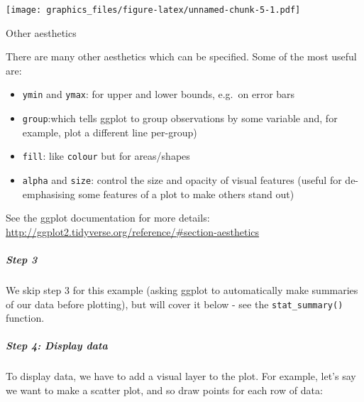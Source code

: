 \documentclass[]{article}
\newenvironment{Shaded}{\begin{snugshade}}{\end{snugshade}}
\newcommand{\KeywordTok}[1]{\textcolor[rgb]{0.13,0.29,0.53}{\textbf{#1}}}
\newcommand{\DataTypeTok}[1]{\textcolor[rgb]{0.13,0.29,0.53}{#1}}
\newcommand{\StringTok}[1]{\textcolor[rgb]{0.31,0.60,0.02}{#1}}
\newcommand{\OperatorTok}[1]{\textcolor[rgb]{0.81,0.36,0.00}{\textbf{#1}}}
\newcommand{\NormalTok}[1]{#1}
\providecommand{\tightlist}{%
  \setlength{\itemsep}{0pt}\setlength{\parskip}{0pt}}
\let\oldsubparagraph\subparagraph
\renewcommand{\subparagraph}[1]{\oldsubparagraph{#1}\mbox{}}
\theoremstyle{definition}
\theoremstyle{definition}
\theoremstyle{definition}
\theoremstyle{remark}
\begin{document}
\begin{Shaded}
\end{Shaded}

\texttt{[image: graphics\_files/figure-latex/unnamed-chunk-5-1.pdf]}

Other aesthetics

There are many other aesthetics which can be specified. Some of the most
useful are:

\begin{itemize}
\tightlist
\item
  \texttt{ymin} and \texttt{ymax}: for upper and lower bounds, e.g.~on
  error bars
\item
  \texttt{group}:which tells ggplot to group observations by some
  variable and, for example, plot a different line per-group)
\item
  \texttt{fill}: like \texttt{colour} but for areas/shapes
\item
  \texttt{alpha} and \texttt{size}: control the size and opacity of
  visual features (useful for de-emphasising some features of a plot to
  make others stand out)
\end{itemize}

See the ggplot documentation for more details:
\url{http://ggplot2.tidyverse.org/reference/\#section-aesthetics}

\subparagraph{Step 3}\label{step-3}

We skip step 3 for this example (asking ggplot to automatically make
summaries of our data before plotting), but will cover it below - see
the \texttt{stat\_summary()} function.

\subparagraph{Step 4: Display data}\label{step-4-display-data}

To display data, we have to add a visual layer to the plot. For example,
let's say we want to make a scatter plot, and so draw points for each
row of data:

\begin{Shaded}
\end{Shaded}
\end{document}
